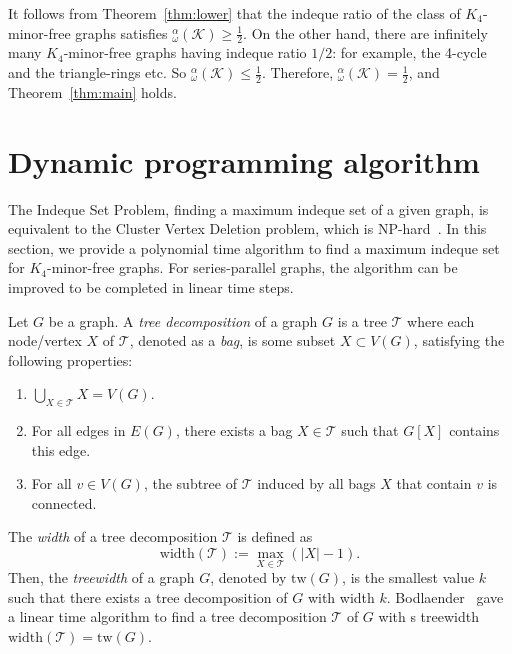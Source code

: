\documentclass{article}
\newcommand{\idq}{{}^{\alpha}_{\omega}}
\begin{document}
\medskip 

It follows from Theorem~\ref{thm:lower} that the indeque ratio of the class of $K_4$-minor-free graphs satisfies $\idq(\mathcal K) \ge \frac{1}{2}$. On the other hand, there are infinitely many $K_4$-minor-free graphs having indeque ratio $1/2$: for example, the 4-cycle and the triangle-rings etc. 
So $\idq(\mathcal K)\le \frac 1 2$. Therefore, $\idq(\mathcal K)=\frac 1 2$, and Theorem~\ref{thm:main} holds. 
 
 
 \iffalse

\section{Dynamic programming algorithm } 


The Indeque Set Problem, finding a maximum indeque set of a given graph, is equivalent to the Cluster Vertex Deletion problem, which is NP-hard~\cite{ELWB}.  
In this section, we provide a polynomial time algorithm to find a maximum indeque set for $K_4$-minor-free graphs. For series-parallel graphs, the algorithm can be improved to be completed in linear time steps. 


Let $G$ be a graph. A {\em tree decomposition} of a graph $G$ is  a tree $\mathcal T$ where each node/vertex $X$ of $\mathcal T$, denoted as a {\em bag}, is some subset $X \subset V(G)$, satisfying the following properties:
\begin{enumerate}
    \item[(i)] $\displaystyle \bigcup_{X \in \mathcal T}X = V(G)$.
    \item[(ii)] For all edges in $E(G)$, there exists a bag $X \in \mathcal T$ such that $G[X]$ contains this edge.
    \item[(iii)] For all $v \in V(G)$, the subtree of $\mathcal T$ induced by all bags $X$ that contain $v$ is connected.
\end{enumerate}
The {\em width} of a tree decomposition $\mathcal T$ is defined as \[\text{width}(\mathcal T):=\displaystyle \max_{X \in \mathcal T}(|X| - 1).\] Then, the {\em treewidth} of a graph $G$, denoted by $\text{tw}(G)$,  is the smallest value $k$ such that there exists a tree decomposition of $G$ with width $k$. Bodlaender~\cite{HLB} gave a linear time algorithm to find a tree decomposition $\mathcal T$ of $G$ with s treewidth  $\text{width}(\mathcal T)=\text{tw}(G)$. 
\end{document}
